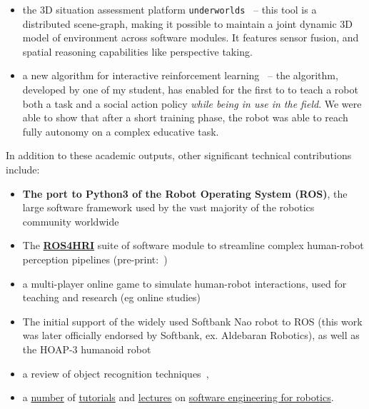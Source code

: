 \begin{itemize}
    \item the 3D situation assessment platform
        \texttt{underworlds}~\autocite{lemaignan2018underworlds} -- this tool
        is a distributed scene-graph, making it possible to maintain a joint
        dynamic 3D model of environment across software modules. It features
        sensor fusion, and spatial reasoning capabilities like perspective
        taking.

    \item a new algorithm for interactive reinforcement
        learning~\autocite{senft2017supervised} -- the algorithm, developed by
        one of my student, has enabled for the first to to teach a robot both a
        task and a social action policy \emph{while being in use in the field}.
        We were able to show that after a short training phase, the robot was
        able to reach fully autonomy on a complex educative task.
\end{itemize}


\vspace{2em}

In addition to these academic outputs, other significant technical contributions
include:

\begin{itemize}
    \item \textbf{The port to Python3 of the Robot Operating System (ROS)}, the large
        software framework used by the vast majority of the robotics community
        worldwide
    \item The \href{https://github.com/ros4hri/ros4hri}{\textbf{ROS4HRI}}
        suite of software module to streamline complex human-robot perception
        pipelines (pre-print:~\cite{mohamed2020ros})
    \item a multi-player online game to simulate human-robot interactions, used
        for teaching and research (eg online studies)
    \item The initial support of the widely used Softbank Nao robot to ROS (this
        work was later officially endorsed by Softbank, ex. Aldebaran Robotics),
        as well as the HOAP-3 humanoid robot
    \item a review of object recognition techniques~\autocite{wallbridge2017qualitative}, 
    \item a         \href{https://github.com/severin-lemaignan/lecture-software-engineering}{number} of
        \href{https://github.com/severin-lemaignan/lecture-intro-programming-for-robotics}{tutorials}
        and \href{https://github.com/severin-lemaignan/git-presentation}{lectures} on \href{https://github.com/severin-lemaignan/ros-presentation}{software engineering for
        robotics}.
\end{itemize}



